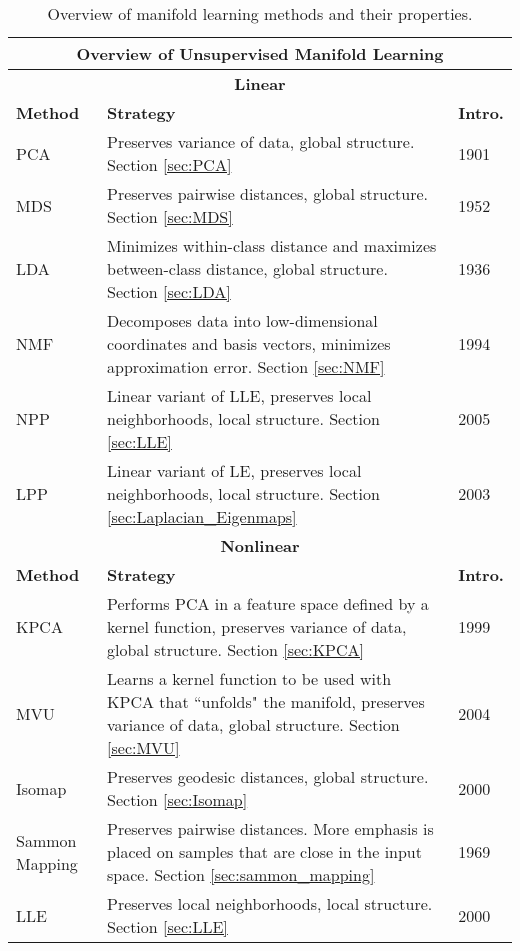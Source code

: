 \begin{longtable}{ |p{}|p{}|p{}| } 
	\caption{Overview of manifold learning methods and their properties.}
	\label{tab:Manifold_Learning_Comparison_Table}\\
	\hline
	\multicolumn{3}{|c|}{\textbf{Overview of Unsupervised Manifold Learning}} \\
	\hline
	\multicolumn{3}{|c|}{\textbf{Linear}} \\
	\hline
	\textbf{Method} & \textbf{Strategy} & \textbf{Intro.}\\
	\hline
	PCA   & Preserves variance of data, global structure. Section \ref{sec:PCA} & 1901\\
	\hline
	MDS  & Preserves pairwise distances, global structure. Section \ref{sec:MDS}  & 1952\\
	\hline
	LDA  & Minimizes within-class distance and maximizes between-class distance, global structure. Section \ref{sec:LDA}  & 1936\\
	\hline
	NMF   & Decomposes data into low-dimensional coordinates and basis vectors, minimizes approximation error. Section \ref{sec:NMF} & 1994\\
	\hline
	NPP  & Linear variant of LLE, preserves local neighborhoods, local structure. Section \ref{sec:LLE}  & 2005\\
	\hline
	LPP  & Linear variant of LE, preserves local neighborhoods, local structure. Section \ref{sec:Laplacian_Eigenmaps}  & 2003\\
	\hline
	\multicolumn{3}{|c|}{\textbf{Nonlinear}} \\
	\hline
	\textbf{Method} & \textbf{Strategy} & \textbf{Intro.}\\
	\hline
	KPCA  & Performs PCA in a feature space defined by a kernel function, preserves variance of data, global structure.  Section \ref{sec:KPCA}  & 1999 \\
	\hline
	MVU  & Learns a kernel function to be used with KPCA that ``unfolds" the manifold, preserves variance of data, global structure. Section \ref{sec:MVU}  & 2004\\
	\hline
	Isomap  & Preserves geodesic distances, global structure.  Section \ref{sec:Isomap}  & 2000 \\
	\hline
	Sammon Mapping  & Preserves pairwise distances.  More emphasis is placed on samples that are close in the input space.  Section \ref{sec:sammon_mapping} & 1969 \\
	\hline
	LLE  & Preserves local neighborhoods, local structure. Section \ref{sec:LLE}  & 2000 \\

\end{longtable}

